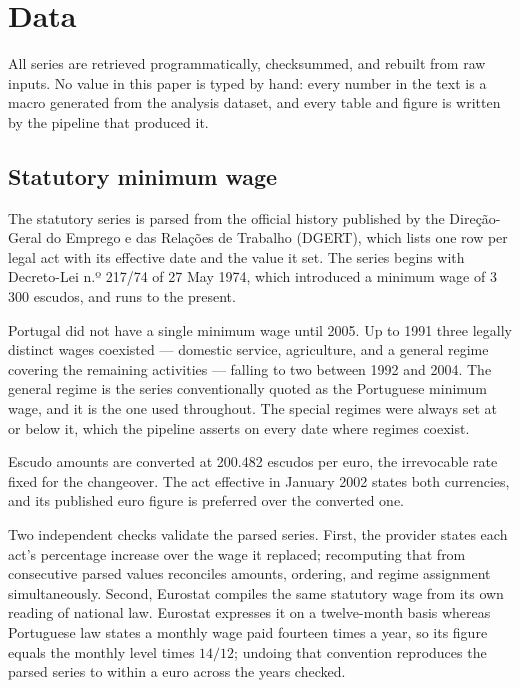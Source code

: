 \section{Data}
\label{sec:data}

All series are retrieved programmatically, checksummed, and rebuilt from raw
inputs. No value in this paper is typed by hand: every number in the text is a
macro generated from the analysis dataset, and every table and figure is written
by the pipeline that produced it.

\subsection{Statutory minimum wage}

The statutory series is parsed from the official history published by the
Direção-Geral do Emprego e das Relações de Trabalho (DGERT), which lists one row
per legal act with its effective date and the value it set. The series begins
with Decreto-Lei n.º 217/74 of 27 May 1974, which introduced a minimum wage of
3\,300 escudos, and runs to the present.

Portugal did not have a single minimum wage until 2005. Up to 1991 three
legally distinct wages coexisted --- domestic service, agriculture, and a general
regime covering the remaining activities --- falling to two between 1992 and 2004.
The general regime is the series conventionally quoted as the Portuguese minimum
wage, and it is the one used throughout. The special regimes were always set at
or below it, which the pipeline asserts on every date where regimes coexist.

Escudo amounts are converted at 200.482 escudos per euro, the irrevocable rate
fixed for the changeover. The act effective in January 2002 states both
currencies, and its published euro figure is preferred over the converted one.

Two independent checks validate the parsed series. First, the provider states
each act's percentage increase over the wage it replaced; recomputing that from
consecutive parsed values reconciles amounts, ordering, and regime assignment
simultaneously. Second, Eurostat compiles the same statutory wage from its own
reading of national law. Eurostat expresses it on a twelve-month basis whereas
Portuguese law states a monthly wage paid fourteen times a year, so its figure
equals the monthly level times $14/12$; undoing that convention reproduces the
parsed series to within a euro across the years checked.

